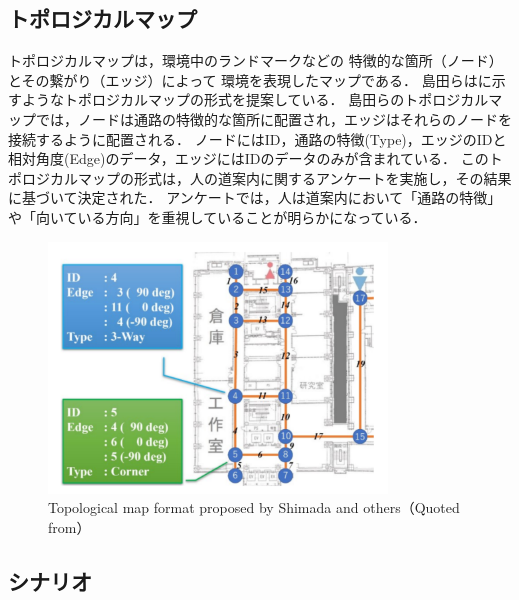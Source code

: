 \subsection{トポロジカルマップ}
トポロジカルマップは，環境中のランドマークなどの
特徴的な箇所（ノード）とその繋がり（エッジ）によって
環境を表現したマップである．
島田らはに示すようなトポロジカルマップの形式\cite{shimada2020}を提案している．
島田らのトポロジカルマップでは，ノードは通路の特徴的な箇所に配置され，エッジはそれらのノードを接続するように配置される．
ノードにはID，通路の特徴(Type)，エッジのIDと相対角度(Edge)のデータ，エッジにはIDのデータのみが含まれている．
このトポロジカルマップの形式は，人の道案内に関するアンケートを実施し，その結果に基づいて決定された．
アンケートでは，人は道案内において「通路の特徴」や「向いている方向」を重視していることが明らかになっている．
\begin{figure}[htbp]
    \centering
     \includegraphics[width=90mm]{images/pdf/topo.pdf}
     \caption[Topological map format proposed by Shimada and others]{Topological map format proposed by Shimada and others（Quoted from\cite{shimada2020}）}
     \label{fig:topo}
\end{figure}
\clearpage
\subsection{シナリオ}

